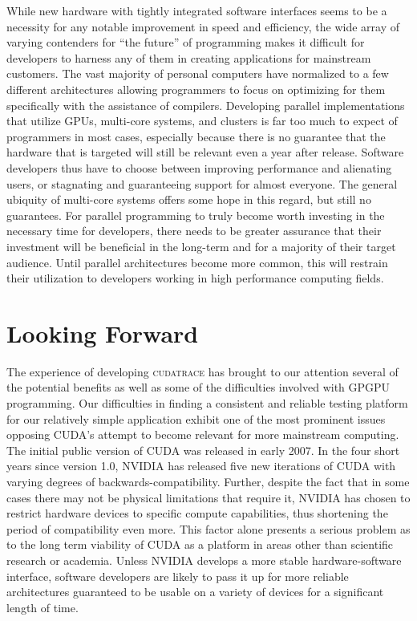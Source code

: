 \documentclass[12pt]{article}
\begin{document}
While new hardware with tightly integrated software interfaces seems to be a necessity for any notable improvement in speed and efficiency, the wide array of varying contenders for ``the future'' of programming makes it difficult for developers to harness any of them in creating applications for mainstream customers. The vast majority of personal computers have normalized to a few different architectures allowing programmers to focus on optimizing for them specifically with the assistance of compilers. Developing parallel implementations that utilize GPUs, multi-core systems, and clusters is far too much to expect of programmers in most cases, especially because there is no guarantee that the hardware that is targeted will still be relevant even a year after release. Software developers thus have to choose between improving performance and alienating users, or stagnating and guaranteeing support for almost everyone. The general ubiquity of multi-core systems offers some hope in this regard, but still no guarantees. For parallel programming to truly become worth investing in  the necessary time for developers, there needs to be greater assurance that their investment will be beneficial in the long-term and for a majority of their target audience. Until parallel architectures become more common, this will restrain their utilization to developers working in high performance computing fields. 

\section{Looking Forward}
The experience of developing \textsc{cudatrace} has brought to our attention several of the potential benefits as well as some of the difficulties involved with GPGPU programming. Our difficulties in finding a consistent and reliable testing platform for our relatively simple application exhibit one of the most prominent issues opposing CUDA's attempt to become relevant for more mainstream computing. The initial public version of CUDA was released in early 2007. In the four short years since version 1.0, NVIDIA has released five new iterations of CUDA with varying degrees of backwards-compatibility. Further, despite the fact that in some cases there may not be physical limitations that require it, NVIDIA has chosen to restrict hardware devices to specific compute capabilities, thus shortening the period of compatibility even more. This factor alone presents a serious problem as to the long term viability of CUDA as a platform in areas other than scientific research or academia. Unless NVIDIA develops a more stable hardware-software interface, software developers are likely to pass it up for more reliable architectures guaranteed to be usable on a variety of devices for a significant length of time.
\end{document}
